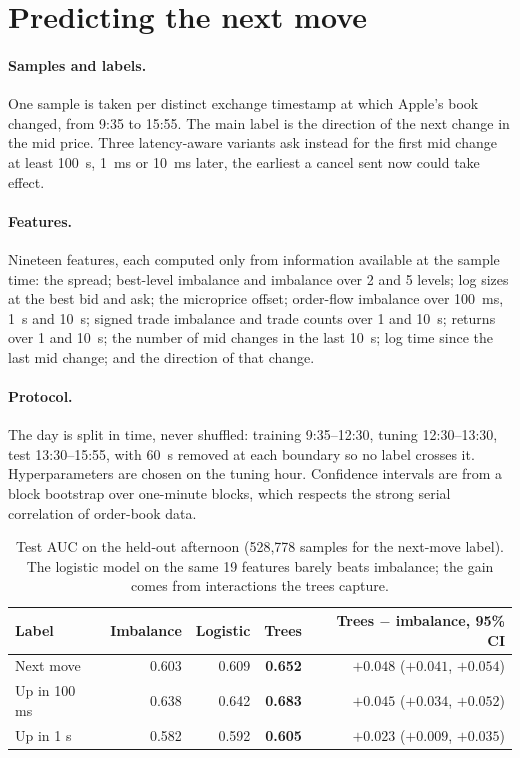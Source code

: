\documentclass[11pt]{article}
\begin{document}
\section{Predicting the next move}\label{sec:model}
\paragraph{Samples and labels.} One sample is taken per distinct exchange timestamp at which Apple's book changed, from 9:35 to 15:55. The main label is the direction of the next change in the mid price. Three latency-aware variants ask instead for the first mid change at least 100~\textmu s, 1~ms or 10~ms later, the earliest a cancel sent now could take effect.

\paragraph{Features.} Nineteen features, each computed only from information available at the sample time: the spread; best-level imbalance and imbalance over 2 and 5 levels; log sizes at the best bid and ask; the microprice offset; order-flow imbalance over 100~ms, 1~s and 10~s; signed trade imbalance and trade counts over 1 and 10~s; returns over 1 and 10~s; the number of mid changes in the last 10~s; log time since the last mid change; and the direction of that change.

\paragraph{Protocol.} The day is split in time, never shuffled: training 9:35--12:30, tuning 12:30--13:30, test 13:30--15:55, with 60~s removed at each boundary so no label crosses it. Hyperparameters are chosen on the tuning hour. Confidence intervals are from a block bootstrap over one-minute blocks, which respects the strong serial correlation of order-book data.

\begin{table}[h]
\centering\small
\begin{tabular}{lrrrr}
\toprule
Label & Imbalance & Logistic & Trees & Trees $-$ imbalance, 95\% CI \\
\midrule
Next move & 0.603 & 0.609 & \textbf{0.652} & $+0.048$ \;($+0.041$, $+0.054$) \\
Up in 100 ms & 0.638 & 0.642 & \textbf{0.683} & $+0.045$ \;($+0.034$, $+0.052$) \\
Up in 1 s & 0.582 & 0.592 & \textbf{0.605} & $+0.023$ \;($+0.009$, $+0.035$) \\
\bottomrule
\end{tabular}
\caption{Test AUC on the held-out afternoon (528{,}778 samples for the next-move label). The logistic model on the same 19 features barely beats imbalance; the gain comes from interactions the trees capture.}
\label{tab:auc}
\end{table}
\end{document}
